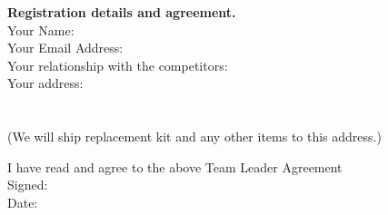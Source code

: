 \documentclass[a4paper, 11pt]{scrartcl}
\begin{document}


\noindent
\textbf{Registration details and agreement.} \\
\doublespacing
\noindent
Your Name:\hrulefill\\
Your Email Address:\hrulefill\\
Your relationship with the competitors:\hrulefill\\
Your address:\hrulefill\\
\hbox{}\hrulefill\\
\hbox{}\hrulefill\\
(We will ship replacement kit and any other items to this address.)

\noindent
\dotfill\hfill

\noindent
I have read and agree to the above Team Leader Agreement\\
Signed:\hrulefill\\
Date:\hrulefill\\

\singlespacing
\end{document}
